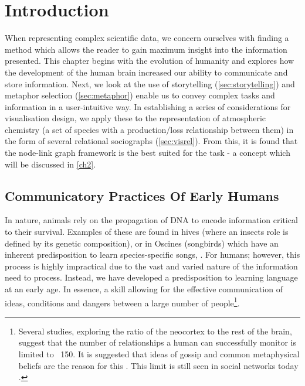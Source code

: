 

\section{Introduction}\label{sec:visbg}

When representing complex scientific data, we concern ourselves with finding a method which allows the reader to gain maximum insight into the information presented. This chapter begins with the evolution of humanity and explores how the development of the human brain increased our ability to communicate and store information. Next, we look at the use of storytelling (\autoref{sec:storytelling}) and metaphor selection (\autoref{sec:metaphor}) enable us to convey complex tasks and information in a user-intuitive way. In establishing a series of considerations for visualisation design, we apply these to the representation of atmospheric chemistry (a set of species with a production/loss relationship between them) in the form of several relational sociographs (\autoref{sec:visrel}). From this, it is found that the node-link graph framework is the best suited for the task - a concept which will be discussed in \autoref{ch2}.

\subsection{Communicatory Practices Of Early Humans}

In nature, animals rely on the propagation of DNA to encode information critical to their survival. Examples of these are found in hives (where an insects role is defined by its genetic composition), or in Oscines (songbirds) which have an inherent predisposition to learn species-specific songs, \citep{modelingpythonbees,genomics,birds,birdsongs,sapiens}. For humans; however, this process is highly impractical due to the vast and varied nature of the information need to process. Instead, we have developed a predisposition to learning language at an early age. In essence, a skill allowing for the effective communication of ideas, conditions and dangers between a large number of people\footnote{Several studies, exploring the ratio of the neocortex to the rest of the brain, suggest that the number of relationships a human can successfully monitor is limited to ~150. It is suggested that ideas of gossip and common metaphysical beliefs are the reason for this \citep{sapiens,neo,gossip}. This limit is still seen in social networks today \citep{social}.}.

